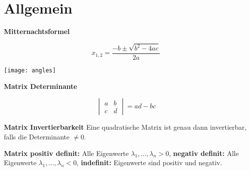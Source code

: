 \section{Allgemein}

\textbf{Mitternachtsformel}

\[
    x_{1, 2} = \frac{-b \pm \sqrt{b^2 - 4ac}}{2a}
\]

\texttt{[image: angles]}

\textbf{Matrix Determinante}

\[
    \begin{vmatrix}
        a & b\\
        c & d
    \end{vmatrix} = ad-bc
\]

\textbf{Matrix Invertierbarkeit} Eine quadratische Matrix ist genau dann invertierbar, falls die Determinante $\neq 0$.

\textbf{Matrix positiv definit:} Alle Eigenwerte $\lambda_1, ..., \lambda_n > 0$, \textbf{negativ definit:} Alle Eigenwerte $\lambda_1, ..., \lambda_n < 0$, \textbf{indefinit:} Eigenwerte sind positiv und negativ.\\